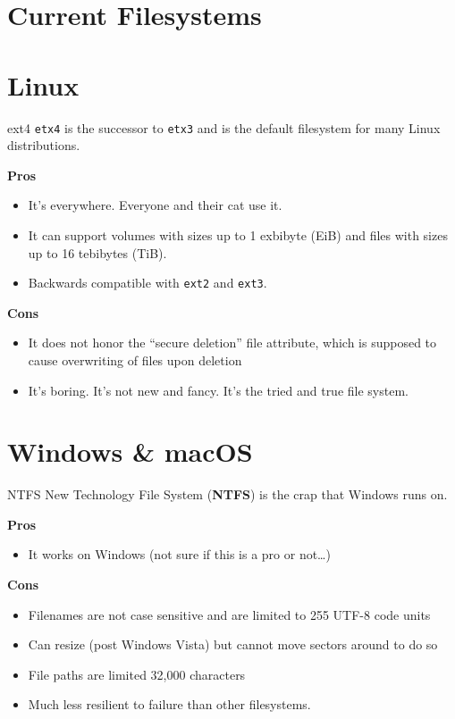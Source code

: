\documentclass{lug}
\begin{document}
\section{Current Filesystems}

\section{Linux}
\begin{frame}{ext4}
    \texttt{etx4} is the successor to \texttt{etx3} and is the default
    filesystem for many Linux distributions.

    \textbf{Pros}
    \begin{itemize}
        \item It's everywhere. Everyone and their cat use it.
        \item It can support volumes with sizes up to 1 exbibyte (EiB) and files
            with sizes up to 16 tebibytes (TiB).
        \item Backwards compatible with \texttt{ext2} and \texttt{ext3}.
    \end{itemize}

    \textbf{Cons}
    \begin{itemize}
        \item It does not honor the ``secure deletion'' file attribute, which is
            supposed to cause overwriting of files upon deletion
        \item It's boring. It's not new and fancy. It's the tried and true file
            system.
    \end{itemize}
\end{frame}

\section{Windows \& macOS}
\begin{frame}{NTFS}
    New Technology File System (\textbf{NTFS}) is the crap that Windows runs on.

    \textbf{Pros}
    \begin{itemize}
        \item It works on Windows (not sure if this is a pro or not\ldots)
    \end{itemize}

    \textbf{Cons}
    \begin{itemize}
        \item Filenames are not case sensitive and are limited to 255 UTF-8 code
            units
        \item Can resize (post Windows Vista) but cannot move sectors around to
            do so
        \item File paths are limited 32,000 characters
        \item Much less resilient to failure than other filesystems.
    \end{itemize}
\end{frame}
\end{document}
